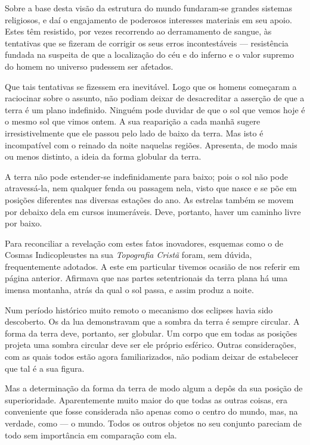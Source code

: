 \documentclass[11pt,a5paper,twoside,openany]{book}
\begin{document}
Sobre a base desta visão da estrutura do mundo fundaram-se grandes sistemas religiosos, e daí o engajamento de poderosos interesses materiais em seu apoio. Estes têm resistido, por vezes recorrendo ao derramamento de sangue, às tentativas que se fizeram de corrigir os seus erros incontestáveis — resistência fundada na suspeita de que a localização do céu e do inferno e o valor supremo do homem no universo pudessem ser afetados.

Que tais tentativas se fizessem era inevitável. Logo que os homens começaram a raciocinar sobre o assunto, não podiam deixar de desacreditar a asserção de que a terra é um plano indefinido. Ninguém pode duvidar de que o sol que vemos hoje é o mesmo sol que vimos ontem. A sua reaparição a cada manhã sugere irresistivelmente que ele passou pelo lado de baixo da terra. Mas isto é incompatível com o reinado da noite naquelas regiões. Apresenta, de modo mais ou menos distinto, a ideia da forma globular da terra.

A terra não pode estender-se indefinidamente para baixo; pois o sol não pode atravessá-la, nem qualquer fenda ou passagem nela, visto que nasce e se põe em posições diferentes nas diversas estações do ano. As estrelas também se movem por debaixo dela em cursos inumeráveis. Deve, portanto, haver um caminho livre por baixo.

Para reconciliar a revelação com estes fatos inovadores, esquemas como o de Cosmas Indicopleustes na sua \textit{Topografia Cristã} foram, sem dúvida, frequentemente adotados. A este em particular tivemos ocasião de nos referir em página anterior. Afirmava que nas partes setentrionais da terra plana há uma imensa montanha, atrás da qual o sol passa, e assim produz a noite.

Num período histórico muito remoto o mecanismo dos eclipses havia sido descoberto. Os da lua demonstravam que a sombra da terra é sempre circular. A forma da terra deve, portanto, ser globular. Um corpo que em todas as posições projeta uma sombra circular deve ser ele próprio esférico. Outras considerações, com as quais todos estão agora familiarizados, não podiam deixar de estabelecer que tal é a sua figura.

Mas a determinação da forma da terra de modo algum a depôs da sua posição de superioridade. Aparentemente muito maior do que todas as outras coisas, era conveniente que fosse considerada não apenas como o centro do mundo, mas, na verdade, como — o mundo. Todos os outros objetos no seu conjunto pareciam de todo sem importância em comparação com ela.
\end{document}

